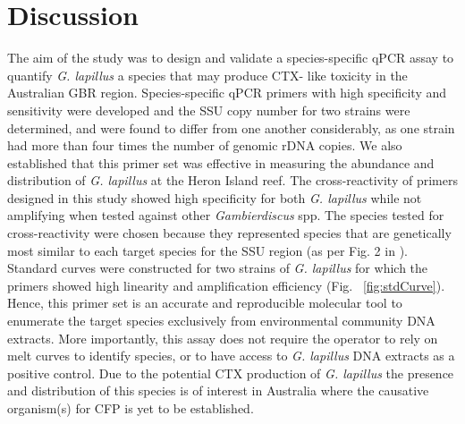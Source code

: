 \documentclass[12pt]{article}
\begin{document}
\section*{Discussion}
The aim of the study was to design and validate a species-specific qPCR assay to quantify \emph{G. lapillus} %
a species that may produce CTX- like toxicity in the Australian GBR region. 
Species-specific qPCR primers with high specificity and sensitivity were developed and the SSU copy number for two strains were determined, and were found to differ from one another considerably, as one strain had more than four times the number of genomic rDNA copies. 
We also established that this primer set was effective in measuring the abundance and distribution of %
\textit{G. lapillus} at the Heron Island reef.
The cross-reactivity of primers designed in this study showed high specificity for both \emph{G. lapillus} %
while not amplifying when tested against other \emph{Gambierdiscus} spp. 
The species tested for cross-reactivity were chosen because they represented species that are genetically most similar to each target species for the SSU region (as per Fig. 2 in \citep{kretzschmar2017characterization}).
Standard curves were constructed for two strains of \emph{G. lapillus} %
for which the primers showed high linearity and amplification efficiency (Fig. ~\ref{fig:stdCurve}). 
Hence, this primer set is an accurate and reproducible molecular tool to enumerate the target species exclusively from environmental community DNA extracts. 
More importantly, %
this assay does not require the operator to rely on melt curves to identify species, or to have access to \emph{G. lapillus} %
DNA extracts as a positive control. 
Due to the potential CTX production of \emph{G. lapillus} \citep{kretzschmar2017characterization,larsson2018toxicology} %
the presence and distribution of this species is of interest in Australia where the causative organism(s) for CFP is yet to be established.\\
\end{document}
